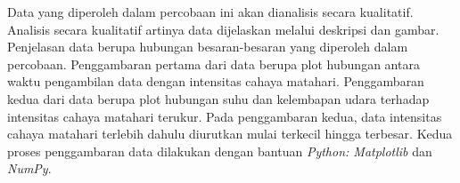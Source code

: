 Data yang diperoleh dalam percobaan ini akan dianalisis secara kualitatif. Analisis secara kualitatif artinya data dijelaskan melalui deskripsi dan gambar. Penjelasan data berupa hubungan besaran-besaran yang diperoleh dalam percobaan. Penggambaran pertama dari data berupa plot hubungan antara waktu pengambilan data dengan intensitas cahaya matahari. Penggambaran kedua dari data berupa plot hubungan suhu dan kelembapan udara terhadap intensitas cahaya matahari terukur. Pada penggambaran kedua, data intensitas cahaya matahari terlebih dahulu diurutkan mulai terkecil hingga terbesar. Kedua proses penggambaran data dilakukan dengan bantuan \textit{Python: Matplotlib} dan \textit{NumPy}.